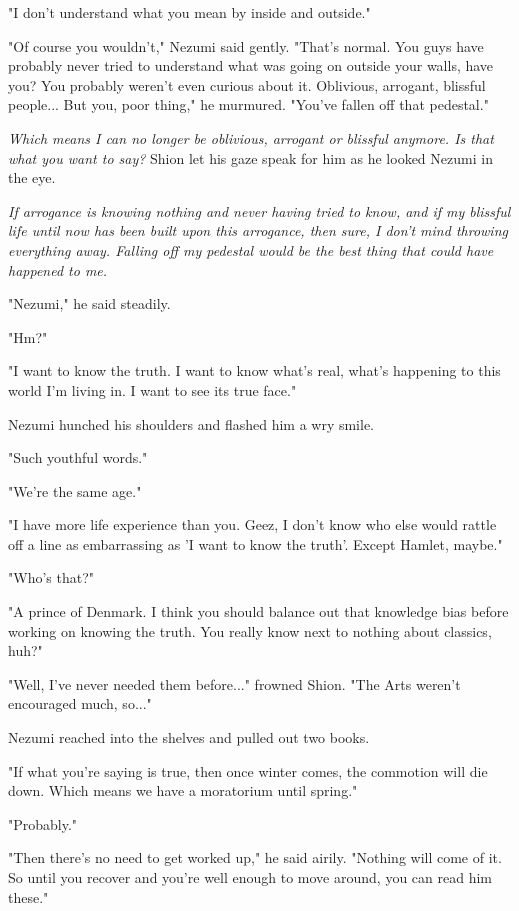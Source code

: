 "I don't understand what you mean by inside and outside."

"Of course you wouldn't," Nezumi said gently. "That's normal. You guys
have probably never tried to understand what was going on outside your
walls, have you? You probably weren't even curious about it. Oblivious,
arrogant, blissful people... But you, poor thing," he murmured. "You've
fallen off that pedestal."

\emph{Which means I can no longer be oblivious, arrogant or blissful anymore.
	Is that what you want to say?} Shion let his gaze speak for him as he
looked Nezumi in the eye.

\emph{If arrogance is knowing nothing and never having tried to know, and if
	my blissful life until now has been built upon this arrogance, then
	sure, I don't mind throwing everything away. Falling off my pedestal
	would be the best thing that could have happened to me.}

"Nezumi," he said steadily.

"Hm?"

"I want to know the truth. I want to know what's real, what's happening
to this world I'm living in. I want to see its true face."

Nezumi hunched his shoulders and flashed him a wry smile.

"Such youthful words."

"We're the same age."

"I have more life experience than you. Geez, I don't know who else would
rattle off a line as embarrassing as 'I want to know the truth'. Except
Hamlet, maybe."

"Who's that?"

"A prince of Denmark. I think you should balance out that knowledge bias
before working on knowing the truth. You really know next to nothing
about classics, huh?"

"Well, I've never needed them before..." frowned Shion. "The Arts
weren't encouraged much, so..."

Nezumi reached into the shelves and pulled out two books.~

"If what you're saying is true, then once winter comes, the commotion
will die down. Which means we have a moratorium until spring."

"Probably."

"Then there's no need to get worked up," he said airily. "Nothing will
come of it. So until you recover and you're well enough to move around,
you can read him these."


